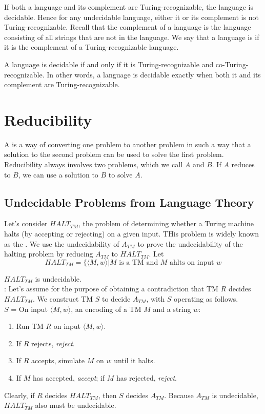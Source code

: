 \documentclass{article}
\begin{document}
If both a language and its complement are Turing-recognizable, the language is decidable. Hence for any undecidable language, either it or its complement is not Turing-recognizable. Recall that the complement of a language is the language consisting of all strings that are not in the language. We say that a language is  if it is the complement of a Turing-recognizable language. 

\begin{theorem}
  A language is decidable if and only if it is Turing-recognizable and co-Turing-recognizable. In other words, a language is decidable exactly when both it and its complement are Turing-recognizable. 
\end{theorem}

\section{Reducibility}

A  is a way of converting one problem to another problem in such a way that a solution to the second problem can be used to solve the first problem. Reducibility always involves two problems, which we call $A$ and $B$. If $A$ reduces to $B$, we can use a solution to $B$ to solve $A$. 

\subsection{Undecidable Problems from Language Theory}

Let's consider $HALT_{TM}$, the problem of determining whether a Turing machine halts (by accepting or rejecting) on a given input. THis problem is widely known as the . We use the undecidability of $A_{TM}$ to prove the undecidability of the halting problem by reducing $A_{TM}$ to $HALT_{TM}$. Let $$HALT_{TM} = \{ \langle M,w \rangle | M \textrm{ is a  TM and } M \textrm{ ahlts on input } w$$ 

\begin{theorem}
  $HALT_{TM}$ is undecidable. \\ 
  : Let's assume for the purpose of obtaining a contradiction that TM $R$ decides $HALT_{TM}$. We construct TM $S$ to decide $A_{TM}$, with $S$ operating as follows. \\ 
  $S$ = On input $\langle M,w \rangle$, an encoding of a TM $M$ and a string $w$:
  \begin{enumerate}
    \item Run TM $R$ on input $\langle M,w \rangle$. 
    \item If $R$ rejects, \emph{reject}. 
    \item If $R$ accepts, simulate $M$ on $w$ until it halts. 
    \item If $M$ has accepted, \emph{accept}; if $M$ has rejected, \emph{reject}. 
  \end{enumerate}
  Clearly, if $R$ decides $HALT_{TM}$, then $S$ decides $A_{TM}$. Because $A_{TM}$ is undecidable, $HALT_{TM}$ also must be undecidable. 
\end{theorem}
\end{document}
